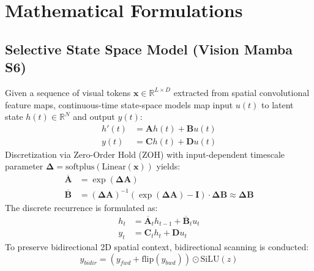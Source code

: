 \documentclass[journal]{IEEEtran}
\begin{document}
\section{Mathematical Formulations}

\subsection{Selective State Space Model (Vision Mamba S6)}
Given a sequence of visual tokens $\mathbf{x} \in \mathbb{R}^{L \times D}$ extracted from spatial convolutional feature maps, continuous-time state-space models map input $u(t)$ to latent state $h(t) \in \mathbb{R}^N$ and output $y(t)$:
\begin{align}
    h'(t) &= \mathbf{A}h(t) + \mathbf{B}u(t) \\
    y(t) &= \mathbf{C}h(t) + \mathbf{D}u(t)
\end{align}
Discretization via Zero-Order Hold (ZOH) with input-dependent timescale parameter $\mathbf{\Delta} = \text{softplus}(\text{Linear}(\mathbf{x}))$ yields:
\begin{align}
    \overline{\mathbf{A}} &= \exp(\mathbf{\Delta} \mathbf{A}) \\
    \overline{\mathbf{B}} &= (\mathbf{\Delta} \mathbf{A})^{-1} (\exp(\mathbf{\Delta} \mathbf{A}) - \mathbf{I}) \cdot \mathbf{\Delta} \mathbf{B} \approx \mathbf{\Delta} \mathbf{B}
\end{align}
The discrete recurrence is formulated as:
\begin{align}
    h_t &= \overline{\mathbf{A}}_t h_{t-1} + \overline{\mathbf{B}}_t u_t \\
    y_t &= \mathbf{C}_t h_t + \mathbf{D} u_t
\end{align}
To preserve bidirectional 2D spatial context, bidirectional scanning is conducted:
\begin{equation}
    y_{bidir} = (y_{fwd} + \text{flip}(y_{bwd})) \odot \text{SiLU}(z)
\end{equation}
\end{document}
